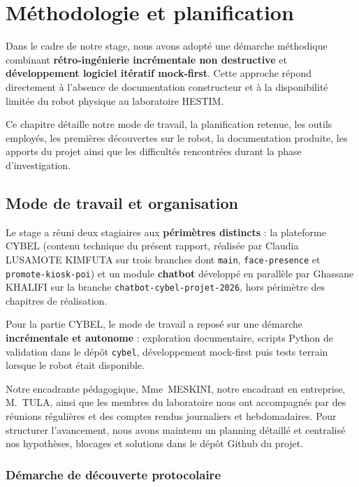 \newpage
\section{Méthodologie et planification}
\label{chap:methodologie_planification}

Dans le cadre de notre stage, nous avons adopté une démarche
méthodique combinant \textbf{rétro-ingénierie incrémentale non destructive}
et \textbf{développement logiciel itératif mock-first}. Cette approche répond
directement à l'absence de documentation constructeur et à la disponibilité
limitée du robot physique au laboratoire HESTIM.

Ce chapitre détaille notre mode de travail, la planification retenue, les
outils employés, les premières découvertes sur le robot, la documentation
produite, les apports du projet ainsi que les difficultés rencontrées durant
la phase d'investigation.


\subsection{Mode de travail et organisation}

Le stage a réuni deux stagiaires aux \textbf{périmètres distincts} : la
plateforme CYBEL (contenu technique du présent rapport, réalisée par
Claudia LUSAMOTE KIMFUTA sur trois branches dont \texttt{main}, \texttt{face-presence}
et \texttt{promote-kiosk-poi}) et un module
\textbf{chatbot} développé en parallèle par Ghassane KHALIFI sur la branche
\texttt{chatbot-cybel-projet-2026}, hors périmètre des chapitres de
réalisation.

Pour la partie CYBEL, le mode de travail a reposé sur une démarche
\textbf{incrémentale et autonome} : exploration documentaire, scripts Python
de validation dans le dépôt \texttt{cybel}, développement mock-first puis
tests terrain lorsque le robot était disponible.

Notre encadrante pédagogique, Mme~\textsc{MESKINI}, notre encadrant en
entreprise, M.~\textsc{TULA}, ainsi que les membres du laboratoire nous ont
accompagnés par des réunions régulières et des comptes rendus journaliers et
hebdomadaires. Pour structurer l'avancement, nous avons
maintenu un planning détaillé et centralisé nos hypothèses, blocages et
solutions dans le dépôt Github du projet.

\subsubsection{Démarche de découverte protocolaire}

